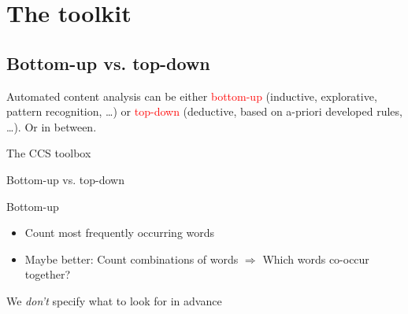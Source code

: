 \documentclass[handout]{beamer}
\begin{document}
\section{The toolkit}
\subsection{Bottom-up vs. top-down}

\begin{frame}[standout]
	Automated content analysis can be either \textcolor{red}{bottom-up} (inductive, explorative, pattern recognition, \ldots) or \textcolor{red}{top-down} (deductive, based on a-priori developed rules, \ldots). Or in between.
\end{frame}

\begin{frame}{The CCS toolbox}
	\\
	\cite{Boumans2016}
\end{frame}

\begin{frame}{Bottom-up vs. top-down}
	\begin{block}{Bottom-up}
		\begin{itemize}
			\item Count most frequently occurring words 
			\item Maybe better: Count combinations of words $\Rightarrow$ Which words co-occur together?
		\end{itemize}
		We \emph{don't} specify what to look for in advance	
	\end{block}
	
\end{frame}
\end{document}
